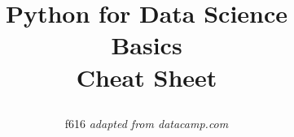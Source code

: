 \documentclass[10pt,a4paper]{article}
\title{
\raggedright
{\textbf{\color{black} Python for Data Science\\
\color{alert}Basics}}
\color{black}\large\\Cheat Sheet}
\author{f616 \emph{adapted from datacamp.com}}
\date{}
\begin{document}
\small
\begin{multicols}{2}

\maketitle
\thispagestyle{empty}
\scriptsize






\end{multicols}
\end{document}
